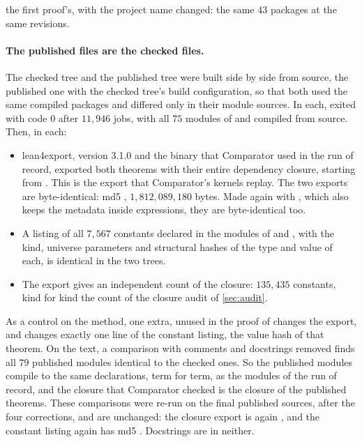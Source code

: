 \documentclass[11pt]{article}
\theoremstyle{definition}
\begin{document}
{the first proof's, with the project name changed: the same $43$ packages at the same revisions.

\paragraph{The published files are the checked files.} The checked tree and the published tree were built side by side from source, the published one with the checked tree's build configuration, so that both used the same compiled packages and differed only in their module sources. In each,  exited with code $0$ after $11{,}946$ jobs, with all $75$ modules of  and  compiled from source. Then, in each:
\begin{itemize}[nosep]
\item lean4export, version 3.1.0 and the binary that Comparator used in the run of record, exported both theorems with their entire dependency closure, starting from . This is the export that Comparator's kernels replay. The two exports are byte-identical: md5 , $1{,}812{,}089{,}180$ bytes. Made again with , which also keeps the metadata inside expressions, they are byte-identical too.
\item A listing of all $7{,}567$ constants declared in the modules of  and , with the kind, universe parameters and structural hashes of the type and value of each, is identical in the two trees.
\item The export gives an independent count of the closure: $135{,}435$ constants, kind for kind the count of the closure audit of \cref{sec:audit}.
\end{itemize}
As a control on the method, one extra, unused  in the proof of  changes the export, and changes exactly one line of the constant listing, the value hash of that theorem. On the text, a comparison with comments and docstrings removed finds all $79$ published modules identical to the checked ones. So the published modules compile to the same declarations, term for term, as the modules of the run of record, and the closure that Comparator checked is the closure of the published theorems. These comparisons were re-run on the final published sources, after the four corrections, and are unchanged: the closure export is again , and the constant listing again has md5 . Docstrings are in neither.

}
\end{document}
